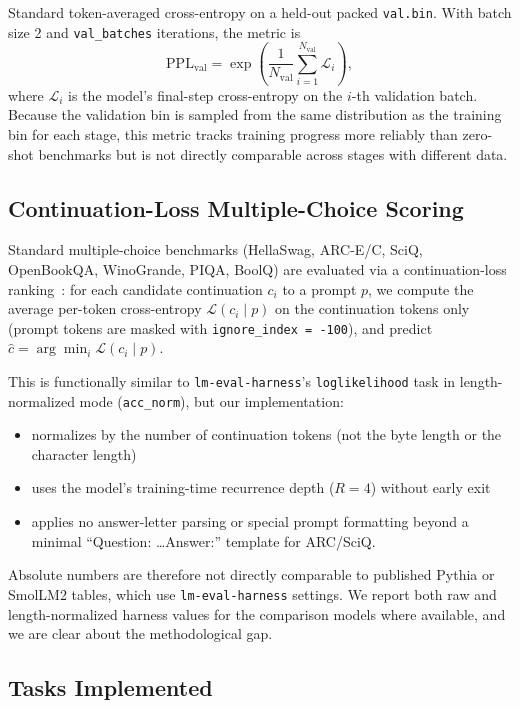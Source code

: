 \documentclass[11pt,a4paper]{article}
\begin{document}
Standard token-averaged cross-entropy on a held-out packed \texttt{val.bin}.
With batch size 2 and \texttt{val\_batches} iterations, the metric is
\begin{equation}
\mathrm{PPL}_{\mathrm{val}} = \exp\left(\frac{1}{N_{\mathrm{val}}}\sum_{i=1}^{N_{\mathrm{val}}} \mathcal{L}_i\right),
\end{equation}
where $\mathcal{L}_i$ is the model's final-step cross-entropy on the $i$-th
validation batch. Because the validation bin is sampled from the same
distribution as the training bin for each stage, this metric tracks training
progress more reliably than zero-shot benchmarks but is not directly
comparable across stages with different data.

\subsection{Continuation-Loss Multiple-Choice Scoring}

Standard multiple-choice benchmarks (HellaSwag, ARC-E/C, SciQ, OpenBookQA,
WinoGrande, PIQA, BoolQ) are evaluated via a continuation-loss
ranking~\cite{eval-harness}: for each candidate continuation $c_i$ to a
prompt $p$, we compute the average per-token cross-entropy
$\mathcal{L}(c_i \mid p)$ on the continuation tokens only (prompt tokens are
masked with \texttt{ignore\_index = -100}), and predict
$\hat{c} = \arg\min_i \mathcal{L}(c_i \mid p)$.

This is functionally similar to \texttt{lm-eval-harness}'s
\texttt{loglikelihood} task in length-normalized mode (\texttt{acc\_norm}),
but our implementation:
\begin{itemize}[noitemsep,leftmargin=*]
  \item normalizes by the number of continuation tokens (not the byte length
    or the character length)
  \item uses the model's training-time recurrence depth ($R = 4$) without
    early exit
  \item applies no answer-letter parsing or special prompt formatting
    beyond a minimal ``Question: \ldots Answer:'' template for ARC/SciQ.
\end{itemize}
Absolute numbers are therefore not directly comparable to published Pythia
or SmolLM2 tables, which use \texttt{lm-eval-harness} settings. We report
both raw and length-normalized harness values for the comparison models
where available, and we are clear about the methodological gap.

\subsection{Tasks Implemented}
\end{document}
